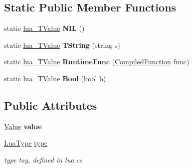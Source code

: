 \subsection*{Static Public Member Functions}
\begin{DoxyCompactItemize}
\item 
\mbox{\label{classzlua_1_1_lua_1_1lua___t_value_a97800485033b66d9c71c10feb346e3d8}} 
static \mbox{\hyperlink{classzlua_1_1_lua_1_1lua___t_value}{lua\+\_\+\+T\+Value}} {\bfseries N\+IL} ()
\item 
\mbox{\label{classzlua_1_1_lua_1_1lua___t_value_ad964177e952edba503efa57eba65f3e3}} 
static \mbox{\hyperlink{classzlua_1_1_lua_1_1lua___t_value}{lua\+\_\+\+T\+Value}} {\bfseries T\+String} (string s)
\item 
\mbox{\label{classzlua_1_1_lua_1_1lua___t_value_a2fc55d56b692dd4c52a16bf394b7a609}} 
static \mbox{\hyperlink{classzlua_1_1_lua_1_1lua___t_value}{lua\+\_\+\+T\+Value}} {\bfseries Runtime\+Func} (\mbox{\hyperlink{classzlua_1_1_lua_1_1_compiled_function}{Compiled\+Function}} func)
\item 
\mbox{\label{classzlua_1_1_lua_1_1lua___t_value_ac7dbb06b3883fb27182603ff0cfc3e45}} 
static \mbox{\hyperlink{classzlua_1_1_lua_1_1lua___t_value}{lua\+\_\+\+T\+Value}} {\bfseries Bool} (bool b)
\end{DoxyCompactItemize}
\subsection*{Public Attributes}
\begin{DoxyCompactItemize}
\item 
\mbox{\label{classzlua_1_1_lua_1_1lua___t_value_afb9b6c691a23a70da7504e57202e6f19}} 
\mbox{\hyperlink{classzlua_1_1_lua_1_1_value}{Value}} {\bfseries value}
\item 
\mbox{\hyperlink{classzlua_1_1_lua_a3bea46ecc2aabf23ac160bd7e7172e70}{Lua\+Type}} \mbox{\hyperlink{classzlua_1_1_lua_1_1lua___t_value_ae44cefc1298fe699be09c2ba73ef92a5}{type}}
\begin{DoxyCompactList}\small\item\em type tag, defined in lua.\+cs \end{DoxyCompactList}\end{DoxyCompactItemize}


